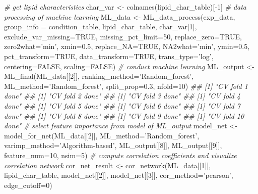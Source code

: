 \documentclass[]{article}
\newcommand{\hlnum}[1]{\textcolor[rgb]{0.816,0.125,0.439}{#1}}%
\newcommand{\hlstr}[1]{\textcolor[rgb]{0.251,0.627,0.251}{#1}}%
\newcommand{\hlcom}[1]{\textcolor[rgb]{0.502,0.502,0.502}{\textit{#1}}}%
\newcommand{\hlopt}[1]{\textcolor[rgb]{0,0,0}{#1}}%
\newcommand{\hlstd}[1]{\textcolor[rgb]{0.251,0.251,0.251}{#1}}%
\newcommand{\hlkwc}[1]{\textcolor[rgb]{0.251,0.251,0.251}{#1}}%
\newcommand{\hlkwd}[1]{\textcolor[rgb]{0.878,0.439,0.125}{#1}}%
\newenvironment{Shaded}{\begin{myshaded}}{\end{myshaded}}
\newcommand{\KeywordTok}[1]{\hlkwd{#1}}
\newcommand{\DataTypeTok}[1]{\hlkwc{#1}}
\newcommand{\DecValTok}[1]{\hlnum{#1}}
\newcommand{\FloatTok}[1]{\hlnum{#1}}
\newcommand{\StringTok}[1]{\hlstr{#1}}
\newcommand{\CommentTok}[1]{\hlcom{#1}}
\newcommand{\OtherTok}[1]{{#1}}
\newcommand{\OperatorTok}[1]{\hlopt{#1}}
\newcommand{\NormalTok}[1]{\hlstd{#1}}
\begin{document}
\begin{Shaded}
\begin{Highlighting}[]
\CommentTok{# get lipid characteristics}
\NormalTok{char_var <-}\StringTok{ }\KeywordTok{colnames}\NormalTok{(lipid_char_table)[}\OperatorTok{-}\DecValTok{1}\NormalTok{]}
\CommentTok{# data processing of machine learning}
\NormalTok{ML_data <-}\StringTok{ }\KeywordTok{ML_data_process}\NormalTok{(exp_data, }\DataTypeTok{group_info =}\NormalTok{ condition_table,}
\NormalTok{                           lipid_char_table, char_var[}\DecValTok{1}\NormalTok{],}
                           \DataTypeTok{exclude_var_missing=}\OtherTok{TRUE}\NormalTok{, }\DataTypeTok{missing_pct_limit=}\DecValTok{50}\NormalTok{,}
                           \DataTypeTok{replace_zero=}\OtherTok{TRUE}\NormalTok{, }\DataTypeTok{zero2what=}\StringTok{'min'}\NormalTok{, }\DataTypeTok{xmin=}\FloatTok{0.5}\NormalTok{,}
                           \DataTypeTok{replace_NA=}\OtherTok{TRUE}\NormalTok{, }\DataTypeTok{NA2what=}\StringTok{'min'}\NormalTok{, }\DataTypeTok{ymin=}\FloatTok{0.5}\NormalTok{,}
                           \DataTypeTok{pct_transform=}\OtherTok{TRUE}\NormalTok{, }\DataTypeTok{data_transform=}\OtherTok{TRUE}\NormalTok{,}
                           \DataTypeTok{trans_type=}\StringTok{'log'}\NormalTok{, }\DataTypeTok{centering=}\OtherTok{FALSE}\NormalTok{, }\DataTypeTok{scaling=}\OtherTok{FALSE}\NormalTok{)}
\CommentTok{# conduct machine learning}
\NormalTok{ML_output <-}\StringTok{ }\KeywordTok{ML_final}\NormalTok{(ML_data[[}\DecValTok{2}\NormalTok{]], }\DataTypeTok{ranking_method=}\StringTok{'Random_forest'}\NormalTok{,}
                      \DataTypeTok{ML_method=}\StringTok{'Random_forest'}\NormalTok{, }\DataTypeTok{split_prop=}\FloatTok{0.3}\NormalTok{, }\DataTypeTok{nfold=}\DecValTok{10}\NormalTok{)}
\CommentTok{## [1] "CV fold 1 done"}
\CommentTok{## [1] "CV fold 2 done"}
\CommentTok{## [1] "CV fold 3 done"}
\CommentTok{## [1] "CV fold 4 done"}
\CommentTok{## [1] "CV fold 5 done"}
\CommentTok{## [1] "CV fold 6 done"}
\CommentTok{## [1] "CV fold 7 done"}
\CommentTok{## [1] "CV fold 8 done"}
\CommentTok{## [1] "CV fold 9 done"}
\CommentTok{## [1] "CV fold 10 done"}
\CommentTok{# select feature importance from model of ML_output}
\NormalTok{model_net <-}\StringTok{ }\KeywordTok{model_for_net}\NormalTok{(ML_data[[}\DecValTok{2}\NormalTok{]], }\DataTypeTok{ML_method=}\StringTok{'Random_forest'}\NormalTok{,}
                           \DataTypeTok{varimp_method=}\StringTok{'Algorithm-based'}\NormalTok{, ML_output[[}\DecValTok{8}\NormalTok{]],}
\NormalTok{                           ML_output[[}\DecValTok{9}\NormalTok{]], }\DataTypeTok{feature_num=}\DecValTok{10}\NormalTok{, }\DataTypeTok{nsim=}\DecValTok{5}\NormalTok{)}
\CommentTok{# compute correlation coefficients and visualize correlation network}
\NormalTok{cor_net_result <-}\StringTok{ }\KeywordTok{cor_network}\NormalTok{(ML_data[[}\DecValTok{1}\NormalTok{]], lipid_char_table,}
\NormalTok{                              model_net[[}\DecValTok{2}\NormalTok{]], model_net[[}\DecValTok{3}\NormalTok{]],}
                              \DataTypeTok{cor_method=}\StringTok{'pearson'}\NormalTok{, }\DataTypeTok{edge_cutoff=}\DecValTok{0}\NormalTok{)}
\end{Highlighting}
\end{Shaded}
\end{document}
